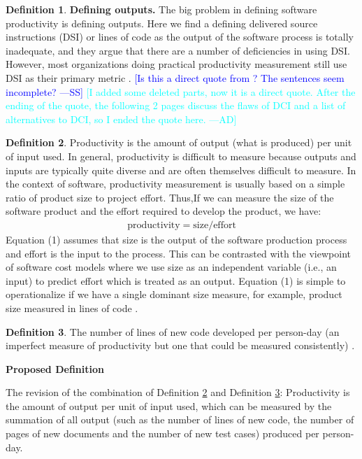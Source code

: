 \documentclass[letterpaper,cleveref]{lipics-v2019}
\newcommand{\authornote}[3]{\textcolor{#1}{[#3 ---#2]}}
\newcommand{\authornote}[3]{}
\newcommand{\wss}[1]{\authornote{blue}{SS}{#1}} %
\newcommand{\ad}[1]{\authornote{cyan}{AD}{#1}} %
\theoremstyle{definition}
\newtheorem{defn}{Definition}
\begin{document}
\begin{defn}
\textbf{Defining outputs.} The big problem in defining software productivity is
defining outputs. Here we find a defining delivered source instructions (DSI) or
lines of code as the output of the software process is totally inadequate, and
they argue that there are a number of deficiencies in using DSI. However,
	most organizations doing practical productivity measurement still use DSI as
	their primary metric \citep{Boehm1987}. \wss{Is this a direct quote from
		\citet{Boehm1987}?  The sentences seem incomplete?}
\ad{I added some deleted parts, now it is a direct quote. After the ending of
the quote, the following 2 pages discuss the flaws of DCI and a list of
alternatives to DCI, so I ended the quote here.}
\end{defn}
\begin{defn}
	\label{ProductivitySelected1}
Productivity is the amount of output (what is produced) per unit of input used.
In general, productivity is difficult to measure because outputs and inputs are
typically quite diverse and are often themselves difficult to measure. In the
context of software, productivity measurement is usually based on a simple ratio
of product size to project effort. Thus,If we can measure the size of the
software product and the effort required to develop the product, we have:
	\begin{align}
	\text{productivity} = \text{size}/\text{effort}
	\end{align}
Equation (1) assumes that size is the output of the software production process
and effort is the input to the process. This can be contrasted with the
	viewpoint of software cost models where we use size as an independent variable
	(i.e., an input) to predict effort which is treated as an output. Equation (1)
	is simple to operationalize if we have a single dominant size measure, for
	example, product size measured in lines of code \citep{Kitchenham2004}.
\end{defn}
\begin{defn}
	\label{ProductivitySelected2}
The number of lines of new code developed per person-day (an imperfect measure
of productivity but one that could be measured consistently)
\citep{MacCormack2003}.
\end{defn}

\noindent \textbf{Proposed Definition} 

The revision of the combination of Definition \ref{ProductivitySelected1} and
Definition \ref{ProductivitySelected2}: Productivity is the
amount of output per unit of input used, which can be measured by the summation
of all output (such as the number of lines of new code, the number of pages of
new documents and the number of new test cases) produced per person-day.
\end{document}

